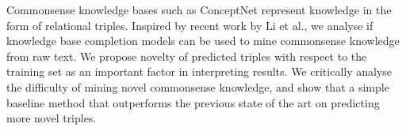 Commonsense knowledge bases such as ConceptNet represent knowledge in the form of relational triples. Inspired by recent work by Li et al., we analyse if knowledge base completion models can be used to mine commonsense knowledge from raw text. We propose novelty of predicted triples with respect to the training set as an important factor in interpreting results. We critically analyse the difficulty of mining novel commonsense knowledge, and show that a simple baseline method that outperforms the previous state of the art on predicting more novel triples.
